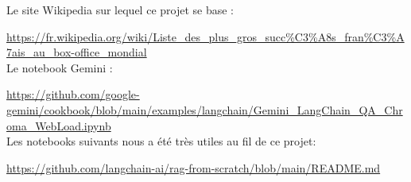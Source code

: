 \documentclass[11pt]{report}
\begin{document}
    Le site Wikipedia sur lequel ce projet se base :
    
    \url{https://fr.wikipedia.org/wiki/Liste_des_plus_gros_succ%C3%A8s_fran%C3%A7ais_au_box-office_mondial} \\


    Le notebook Gemini : 
    
    \url{https://github.com/google-gemini/cookbook/blob/main/examples/langchain/Gemini_LangChain_QA_Chroma_WebLoad.ipynb} \\
 
    Les notebooks suivants nous a été très utiles au fil de ce projet:

    \url{https://github.com/langchain-ai/rag-from-scratch/blob/main/README.md}
\end{document}
